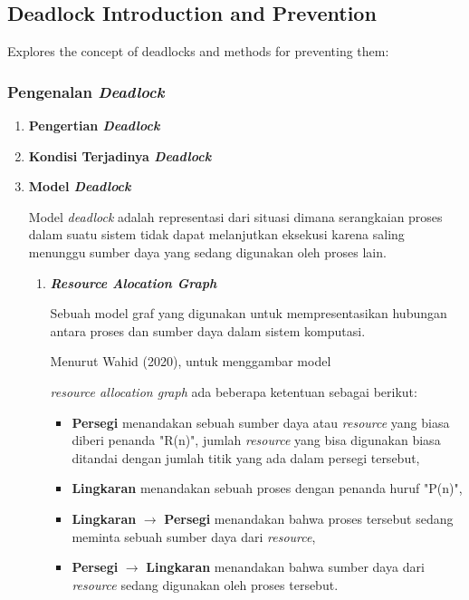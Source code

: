 \documentclass[12pt]{article}
\begin{document}
\subsection{Deadlock Introduction and Prevention}
Explores the concept of deadlocks and methods for preventing them:
\begin{itemize}
    \subsubsection{Pengenalan \textit{Deadlock}}
        \begin{enumerate}
            \item \textbf{Pengertian \textit{Deadlock}}
            \item \textbf{Kondisi Terjadinya \textit{Deadlock}}
            \item \textbf{Model \textit{Deadlock}}

                \hspace{1cm}
                Model \textit{deadlock} adalah representasi dari situasi dimana serangkaian proses dalam suatu sistem tidak dapat melanjutkan eksekusi karena saling menunggu sumber daya yang sedang digunakan oleh proses lain.\newline
                
                \begin{enumerate}
                    \item \textit{\textbf{Resource Alocation Graph}}

                        \hspace{1cm}
                        Sebuah model graf yang digunakan untuk mempresentasikan hubungan antara proses dan sumber daya dalam sistem komputasi.

                        \hspace{1cm}
                        Menurut Wahid (2020), untuk menggambar model 
                        
                        \textit{resource allocation graph} ada beberapa ketentuan sebagai berikut:
                        
                        \begin{itemize}
                            \item \textbf{Persegi} menandakan sebuah sumber daya atau \textit{resource} yang biasa diberi penanda "R(n)", jumlah \textit{resource} yang bisa digunakan biasa ditandai dengan jumlah titik yang ada dalam persegi tersebut,
                            \item \textbf{Lingkaran} menandakan sebuah proses dengan penanda huruf "P(n)",
                            \item \textbf{Lingkaran} $\longrightarrow$ \textbf{Persegi} menandakan bahwa proses tersebut sedang meminta sebuah sumber daya dari \textit{resource},
                            \item \textbf{Persegi} $\longrightarrow$ \textbf{Lingkaran} menandakan bahwa sumber daya dari \textit{resource} sedang digunakan oleh proses tersebut.\newline
                        \end{itemize}


\end{enumerate}
\end{enumerate}
\end{itemize}
\end{document}
